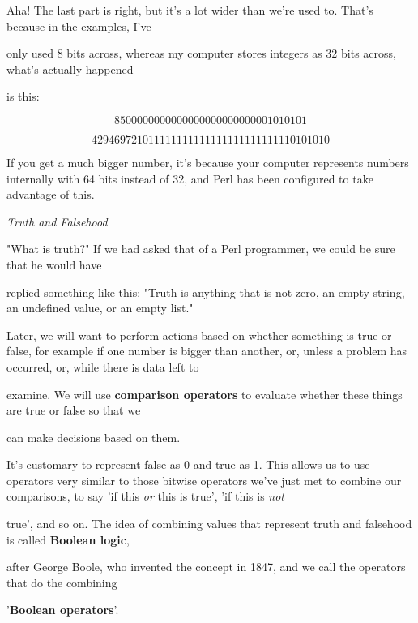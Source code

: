 \documentclass[a4paper,11pt]{book}
\begin{document}
\noindent Aha! The last part is right, but it's a lot wider than we're used to. That's because in the examples, I've

\noindent only used 8 bits across, whereas my computer stores integers as 32 bits across, what's actually happened

\noindent is this:

\noindent 

\[85     00000000000000000000000001010101\] 

\[4294697210    11111111111111111111111110101010\] 


\noindent If you get a much bigger number, it's because your computer represents numbers internally with 64 bits instead of 32, and Perl has been configured to take advantage of this.

\noindent 

\noindent \textit{Truth and Falsehood}

\noindent "What is truth?" If we had asked that of a Perl programmer, we could be sure that he would have

\noindent replied something like this: "Truth is anything that is not zero, an empty string, an undefined value, or an empty list."

\noindent 

\noindent Later, we will want to perform actions based on whether something is true or false, for example if one number is bigger than another, or, unless a problem has occurred, or, while there is data left to

\noindent examine. We will use \textbf{comparison operators }to evaluate whether these things are true or false so that we

\noindent can make decisions based on them.

\noindent 

\noindent It's customary to represent false as 0 and true as 1. This allows us to use operators very similar to those bitwise operators we've just met to combine our comparisons, to say 'if this \textit{or }this is true', 'if this is \textit{not}

\noindent true', and so on. The idea of combining values that represent truth and falsehood is called \textbf{Boolean logic},

\noindent after George Boole, who invented the concept in 1847, and we call the operators that do the combining

\noindent '\textbf{Boolean operators}'.

\noindent 
\end{document}
